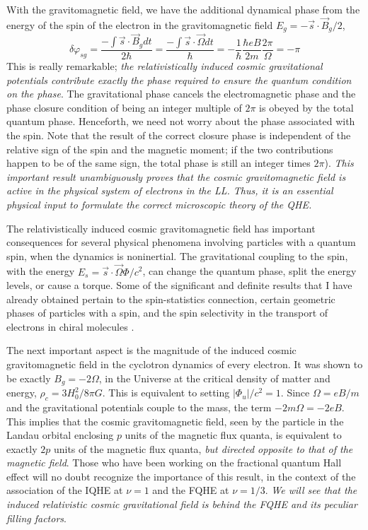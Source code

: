 \documentclass[aps,preprint,12pt,tightenlines]{revtex4}%
\begin{document}
With the gravitomagnetic field, we have the additional dynamical phase from
the energy of the spin of the electron in the gravitomagnetic field
$E_{g}=-\vec{s}\cdot\vec{B}_{g}/2$,%
\begin{equation}
\delta\varphi_{sg}=\frac{-\int\vec{s}\cdot\vec{B}_{g}dt}{2\hbar}=\frac
{-\int\vec{s}\cdot\vec{\Omega}dt}{\hbar}=-\frac{1}{\hbar}\frac{\hbar eB}%
{2m}\frac{2\pi}{\Omega}=-\pi
\end{equation}
This is really remarkable; \emph{the relativistically induced cosmic gravitational
potentials contribute exactly the phase required to ensure the quantum
condition on the phase}. The gravitational phase cancels the electromagnetic
phase and the phase closure condition of being an integer multiple of $2\pi$
is obeyed by the total quantum phase. Henceforth, we need not worry about the
phase associated with the spin. Note that the result of the correct closure
phase is independent of the relative sign of the spin and the magnetic moment;
if the two contributions happen to be of the same sign, the total phase is
still an integer times $2\pi$). \textit{This important result unambiguously
proves that the cosmic gravitomagnetic field is active in the physical system
of electrons in the LL. Thus, it is an essential physical input to formulate the
correct microscopic theory of the QHE.}

The relativistically induced cosmic gravitomagnetic field has important
consequences for several physical phenomena involving particles with a quantum
spin, when the dynamics is noninertial. The gravitational coupling to the
spin, with the energy $E_{s}=\vec{s}\cdot\vec{\Omega}\Phi/c^{2}$, can change
the quantum phase, split the energy levels, or cause a torque. Some of the
significant and definite results that I have already obtained pertain to the
spin-statistics connection, certain geometric phases of particles with a spin,
and the spin selectivity in the transport of electrons in chiral molecules
\cite{Unni-PhysNews,Naaman,Unni-NJP}.

The next important aspect is the magnitude of the induced cosmic
gravitomagnetic field in the cyclotron dynamics of every electron. It was
shown to be exactly $B_{g}=-2\Omega$, in the Universe at the critical density
of matter and energy, $\rho_{c}=3H_{0}^{2}/8\pi G$. This is equivalent to
setting $\left\vert \Phi_{u}\right\vert /c^{2}=1$. Since $\Omega=eB/m$ and the
gravitational potentials couple to the mass, the term $-2m\Omega=-2eB$. This
implies that the cosmic gravitomagnetic field, seen by the particle in the
Landau orbital enclosing $p$ units of the magnetic flux quanta, is equivalent
to exactly $2p$ units of the magnetic flux quanta, \emph{but directed opposite
to that of the magnetic field}. Those who have been working on the fractional
quantum Hall effect will no doubt recognize the importance of this result, in
the context of the association of the IQHE at $\nu=1$ and the FQHE at
$\nu=1/3$. \emph{We will see that the induced relativistic cosmic
gravitational field is behind the FQHE and its peculiar filling factors}.
\end{document}
